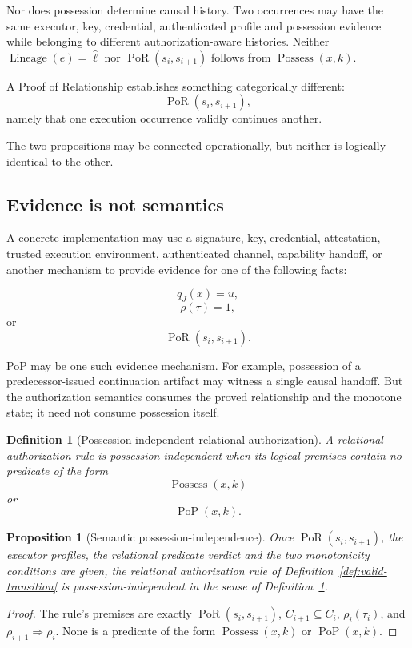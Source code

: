\documentclass[10pt,twocolumn]{article}
\newcommand{\PoR}{\operatorname{PoR}}
\newcommand{\PoP}{\operatorname{PoP}}
\newtheorem{definition}{Definition}
\newtheorem{proposition}{Proposition}
\begin{document}
Nor does possession determine causal history. Two occurrences may have the
same executor, key, credential, authenticated profile and possession evidence
while belonging to different authorization-aware histories. Neither
\(\operatorname{Lineage}(e)=\widehat{\ell}\) nor
\(\PoR(s_i,s_{i+1})\) follows from \(\operatorname{Possess}(x,k)\).

A Proof of Relationship establishes something categorically different:
\[
\PoR(s_i,s_{i+1}),
\]
namely that one execution occurrence validly continues another.

The two propositions may be connected operationally, but neither is logically
identical to the other.

\subsection{Evidence is not semantics}

A concrete implementation may use a signature, key, credential, attestation,
trusted execution environment, authenticated channel, capability handoff, or
another mechanism to provide evidence for one of the following facts:

\[
q_J(x)=u,
\]
\[
\rho(\tau)=1,
\]
or
\[
\PoR(s_i,s_{i+1}).
\]

PoP may be one such evidence mechanism. For example, possession of a
predecessor-issued continuation artifact may witness a single causal handoff.
But the authorization semantics consumes the proved relationship and the
monotone state; it need not consume possession itself.

\begin{definition}[Possession-independent relational authorization]
\label{def:possindep}
A relational authorization rule is possession-independent when its logical
premises contain no predicate of the form
\[
\operatorname{Possess}(x,k)
\]
or
\[
\PoP(x,k).
\]
\end{definition}

\begin{proposition}[Semantic possession-independence]
\label{prop:semantic-possession-independence}
Once \(\PoR(s_i,s_{i+1})\), the executor profiles, the relational predicate
verdict and the two monotonicity conditions are given, the relational
authorization rule of Definition~\ref{def:valid-transition} is
possession-independent in the sense of Definition~\ref{def:possindep}.
\end{proposition}

\begin{proof}
The rule's premises are exactly
\(\PoR(s_i,s_{i+1})\), \(C_{i+1}\subseteq C_i\),
\(\rho_i(\tau_i)\), and \(\rho_{i+1}\Rightarrow\rho_i\). None is a predicate
of the form \(\operatorname{Possess}(x,k)\) or \(\PoP(x,k)\).
\end{proof}
\end{document}
